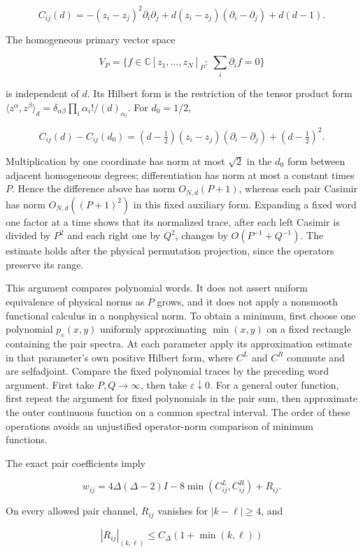 \[
C_{ij}(d)=-(z_i-z_j)^2\partial_i\partial_j
+d(z_i-z_j)(\partial_i-\partial_j)+d(d-1).
\]

The homogeneous primary vector space

\[
V_P=\{f\in\mathbb C[z_1,\ldots,z_N]_P:\ \sum_i\partial_i f=0\}
\]

is independent of \(d\). Its Hilbert form is the restriction of the tensor product form \(\langle z^\alpha,z^\beta\rangle_d=\delta_{\alpha\beta}\prod_i\alpha_i!/(d)_{\alpha_i}\). For \(d_0=1/2\),

\[
C_{ij}(d)-C_{ij}(d_0)
=(d-\tfrac12)(z_i-z_j)(\partial_i-\partial_j)+(d-\tfrac12)^2.
\]

Multiplication by one coordinate has norm at most \(\sqrt2\) in the \(d_0\) form between adjacent homogeneous degrees; differentiation has norm at most a constant times \(P\). Hence the difference above has norm \(O_{N,d}(P+1)\), whereas each pair Casimir has norm \(O_{N,d}((P+1)^2)\) in this fixed auxiliary form. Expanding a fixed word one factor at a time shows that its normalized trace, after each left Casimir is divided by \(P^2\) and each right one by \(Q^2\), changes by \(O(P^{-1}+Q^{-1})\). The estimate holds after the physical permutation projection, since the operators preserve its range.

This argument compares polynomial words. It does not assert uniform equivalence of physical norms as \(P\) grows, and it does not apply a nonsmooth functional calculus in a nonphysical norm. To obtain a minimum, first choose one polynomial \(p_\varepsilon(x,y)\) uniformly approximating \(\min(x,y)\) on a fixed rectangle containing the pair spectra. At each parameter apply its approximation estimate in that parameter's own positive Hilbert form, where \(C^L\) and \(C^R\) commute and are selfadjoint. Compare the fixed polynomial traces by the preceding word argument. First take \(P,Q\to\infty\), then take \(\varepsilon\downarrow0\). For a general outer function, first repeat the argument for fixed polynomials in the pair sum, then approximate the outer continuous function on a common spectral interval. The order of these operations avoids an unjustified operator-norm comparison of minimum functions.

The exact pair coefficients imply

\[
w_{ij}=4\Delta(\Delta-2)I
-8\min(C_{ij}^L,C_{ij}^R)+R_{ij}.
\]

On every allowed pair channel, \(R_{ij}\) vanishes for \(|k-\ell|\geq4\), and

\[
|R_{ij}|_{(k,\ell)}\leq C_\Delta(1+\min(k,\ell))
\]

